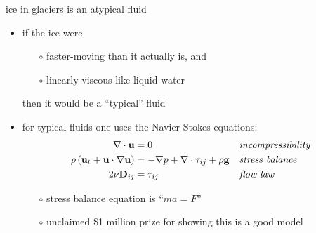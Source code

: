\begin{frame}{ice in glaciers is an atypical fluid}

\begin{itemize}
\item if the ice were
  \begin{itemize}
  \item[$\circ$] faster-moving than it actually is, and
  \item[$\circ$] linearly-viscous like liquid water
  \end{itemize}
  
  then it would be a ``typical'' fluid

\bigskip
\item for typical fluids one uses the Navier-Stokes equations:
\begin{align*}
\nabla \cdot \mathbf{u} &= 0 &&\text{\emph{incompressibility}} \\
\rho \left(\mathbf{u}_t + \mathbf{u}\cdot\nabla \mathbf{u}\right) &= -\nabla p + \nabla \cdot \tau_{ij} + \rho \mathbf{g} &&\text{\emph{stress balance}} \\
2 \nu \mathbf{D}_{ij} &= \tau_{ij} &&\text{\emph{flow law}}
\end{align*}

\medskip
    \begin{itemize}
    \item[$\circ$] stress balance equation is ``$m a = F$''
    \item[$\circ$] unclaimed \$1 million prize for showing this is a good model
    \end{itemize}
\end{itemize}
\end{frame}


